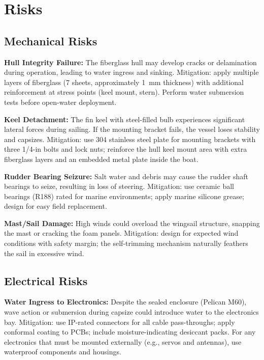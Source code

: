 
\section{Risks}
\label{sec:risks}


\subsection{Mechanical Risks}

\textcolor{riskgreen}{\textbf{Hull Integrity Failure:}} The fiberglass hull may develop cracks or delamination during operation, leading to water ingress and sinking. Mitigation: apply multiple layers of fiberglass (7 sheets, approximately 1~mm thickness) with additional reinforcement at stress points (keel mount, stern). Perform water submersion tests before open-water deployment.

\textcolor{riskgreen}{\textbf{Keel Detachment:}} The fin keel with steel-filled bulb experiences significant lateral forces during sailing. If the mounting bracket fails, the vessel loses stability and capsizes. Mitigation: use 304 stainless steel plate for mounting brackets with three 1/4-in bolts and lock nuts; reinforce the hull keel mount area with extra fiberglass layers and an embedded metal plate inside the boat.

\textcolor{riskgreen}{\textbf{Rudder Bearing Seizure:}} Salt water and debris may cause the rudder shaft bearings to seize, resulting in loss of steering. Mitigation: use ceramic ball bearings (R188) rated for marine environments; apply marine silicone grease; design for easy field replacement.

\textcolor{riskyellow}{\textbf{Mast/Sail Damage:}} High winds could overload the wingsail structure, snapping the mast or cracking the foam panels. Mitigation: design for expected wind conditions with safety margin; the self-trimming mechanism naturally feathers the sail in excessive wind.


\subsection{Electrical Risks}

\textcolor{riskgreen}{\textbf{Water Ingress to Electronics:}} Despite the sealed enclosure (Pelican M60), wave action or submersion during capsize could introduce water to the electronics bay. Mitigation: use IP-rated connectors for all cable pass-throughs; apply conformal coating to PCBs; include moisture-indicating desiccant packs. For any electronics that must be mounted externally (e.g., servos and antennas), use waterproof components and housings.

